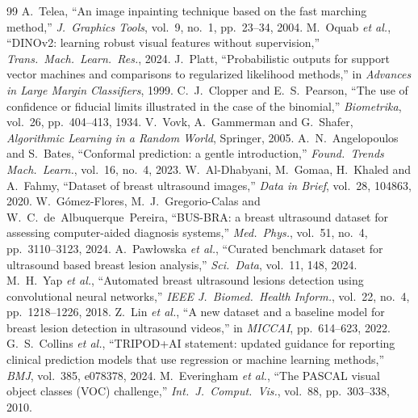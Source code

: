 \begin{thebibliography}{99}
 A.~Telea, ``An image inpainting technique based on the fast marching method,'' \emph{J.\ Graphics Tools}, vol.~9, no.~1, pp.~23--34, 2004.
 M.~Oquab \emph{et al.}, ``DINOv2: learning robust visual features without supervision,'' \emph{Trans.\ Mach.\ Learn.\ Res.}, 2024.
 J.~Platt, ``Probabilistic outputs for support vector machines and comparisons to regularized likelihood methods,'' in \emph{Advances in Large Margin Classifiers}, 1999.
 C.~J.~Clopper and E.~S.~Pearson, ``The use of confidence or fiducial limits illustrated in the case of the binomial,'' \emph{Biometrika}, vol.~26, pp.~404--413, 1934.
 V.~Vovk, A.~Gammerman and G.~Shafer, \emph{Algorithmic Learning in a Random World}, Springer, 2005.
 A.~N.~Angelopoulos and S.~Bates, ``Conformal prediction: a gentle introduction,'' \emph{Found.\ Trends Mach.\ Learn.}, vol.~16, no.~4, 2023.
 W.~Al-Dhabyani, M.~Gomaa, H.~Khaled and A.~Fahmy, ``Dataset of breast ultrasound images,'' \emph{Data in Brief}, vol.~28, 104863, 2020.
 W.~G\'omez-Flores, M.~J.~Gregorio-Calas and W.~C.~de~Albuquerque~Pereira, ``BUS-BRA: a breast ultrasound dataset for assessing computer-aided diagnosis systems,'' \emph{Med.\ Phys.}, vol.~51, no.~4, pp.~3110--3123, 2024.
 A.~Paw{\l}owska \emph{et al.}, ``Curated benchmark dataset for ultrasound based breast lesion analysis,'' \emph{Sci.\ Data}, vol.~11, 148, 2024.
 M.~H.~Yap \emph{et al.}, ``Automated breast ultrasound lesions detection using convolutional neural networks,'' \emph{IEEE J.\ Biomed.\ Health Inform.}, vol.~22, no.~4, pp.~1218--1226, 2018.
 Z.~Lin \emph{et al.}, ``A new dataset and a baseline model for breast lesion detection in ultrasound videos,'' in \emph{MICCAI}, pp.~614--623, 2022.
 G.~S.~Collins \emph{et al.}, ``TRIPOD+AI statement: updated guidance for reporting clinical prediction models that use regression or machine learning methods,'' \emph{BMJ}, vol.~385, e078378, 2024.
 M.~Everingham \emph{et al.}, ``The PASCAL visual object classes (VOC) challenge,'' \emph{Int.\ J.\ Comput.\ Vis.}, vol.~88, pp.~303--338, 2010.
\end{thebibliography}
